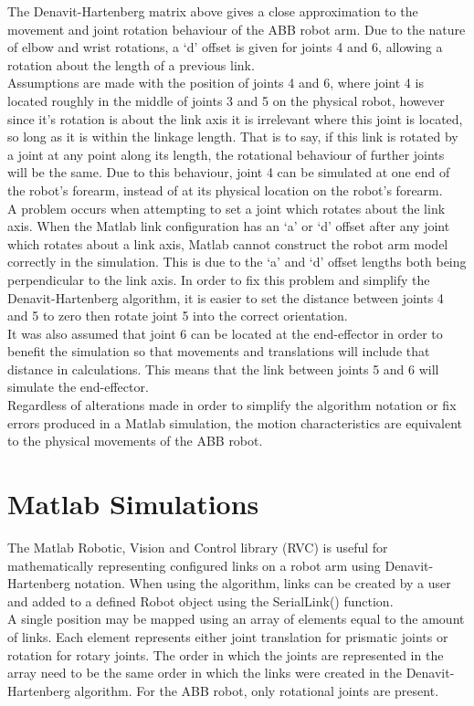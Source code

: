 \documentclass[11pt,a4paper]{report}
\begin{document}
The Denavit-Hartenberg matrix above gives a close approximation to the movement and joint rotation behaviour of the ABB robot arm. Due to the nature of elbow and wrist rotations, a `d' offset is given for joints 4 and 6, allowing a rotation about the length of a previous link.\\
Assumptions are made with the position of joints 4 and 6, where joint 4 is located roughly in the middle of joints 3 and 5 on the physical robot, however since it's rotation is about the link axis it is irrelevant where this joint is located, so long as it is within the linkage length. That is to say, if this link is rotated by a joint at any point along its length, the rotational behaviour of further joints will be the same. Due to this behaviour, joint 4 can be simulated at one end of the robot's forearm, instead of at its physical location on the robot's forearm.\\
A problem occurs when attempting to set a joint which rotates about the link axis. When the Matlab link configuration has an `a' or `d' offset after any joint which rotates about a link axis, Matlab cannot construct the robot arm model correctly in the simulation. This is due to the `a' and `d' offset lengths both being perpendicular to the link axis. In order to fix this problem and simplify the Denavit-Hartenberg algorithm, it is easier to set the distance between joints 4 and 5 to zero then rotate joint 5 into the correct orientation.\\
It was also assumed that joint 6 can be located at the end-effector in order to benefit the simulation so that movements and translations will include that distance in calculations. This means that the link between joints 5 and 6 will simulate the end-effector.\\
Regardless of alterations made in order to simplify the algorithm notation or fix errors produced in a Matlab simulation, the motion characteristics are equivalent to the physical movements of the ABB robot.

\section{Matlab Simulations}
The Matlab Robotic, Vision and Control library (RVC) is useful for mathematically representing configured links on a robot arm using Denavit-Hartenberg notation. When using the algorithm, links can be created by a user and added to a defined Robot object using the SerialLink() function.\\
A single position may be mapped using an array of elements equal to the amount of links. Each element represents either joint translation for prismatic joints or rotation for rotary joints. The order in which the joints are represented in the array need to be the same order in which the links were created in the Denavit-Hartenberg algorithm. For the ABB robot, only rotational joints are present. 
\end{document}

